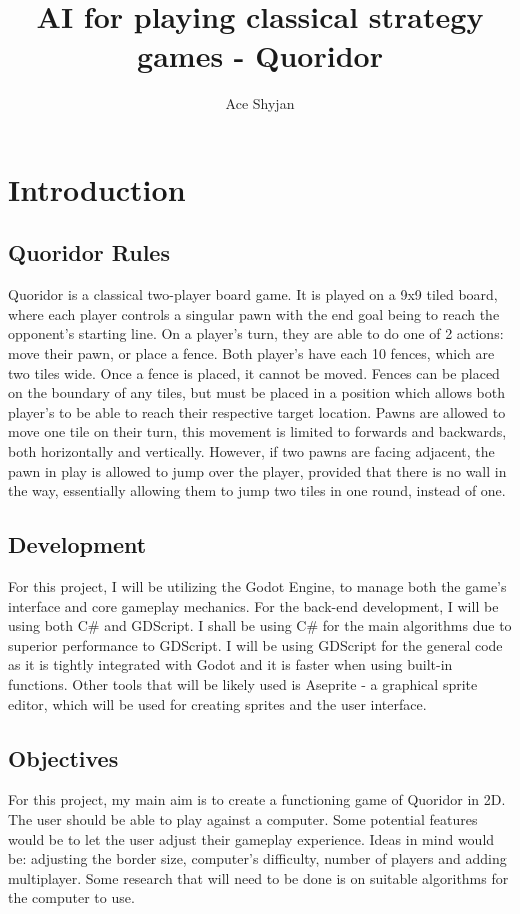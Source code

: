 \documentclass[review]{cmpreport}
\title{AI for playing classical strategy games - Quoridor}
\author{Ace Shyjan}
\begin{document}
	
	\section{Introduction}
	
	\subsection{Quoridor Rules}
	Quoridor is a classical two-player board game. It is played on a 9x9 tiled board, where each player controls a singular pawn with the end goal being to reach the opponent's starting line. On a player's turn, they are able to do one of 2 actions: move their pawn, or place a fence. Both player's have each 10 fences, which are two tiles wide. Once a fence is placed, it cannot be moved. Fences can be placed on the boundary of any tiles, but must be placed in a position which allows both player's to be able to reach their respective target location. Pawns are allowed to move one tile on their turn, this movement is limited to forwards and backwards, both horizontally and vertically. However, if two pawns are facing adjacent, the pawn in play is allowed to jump over the player, provided that there is no wall in the way, essentially allowing them to jump two tiles in one round, instead of one. 
	
	\subsection{Development}
	For this project, I will be utilizing the Godot Engine, to manage both the game's interface and core gameplay mechanics. For the back-end development, I will be using both C\# and GDScript. I shall be using C\# for the main algorithms due to superior performance to GDScript. I will be using GDScript for the general code as it is tightly integrated with Godot and it is faster when using built-in functions. Other tools that will be likely used is Aseprite - a graphical sprite editor, which will be used for creating sprites and the user interface.
	
	\subsection{Objectives}
	For this project, my main aim is to create a functioning game of Quoridor in 2D. The user should be able to play against a computer. Some potential features would be to let the user adjust their gameplay experience. Ideas in mind would be: adjusting the border size, computer's difficulty, number of players and adding multiplayer. Some research that will need to be done is on suitable algorithms for the computer to use.
	
\end{document}
